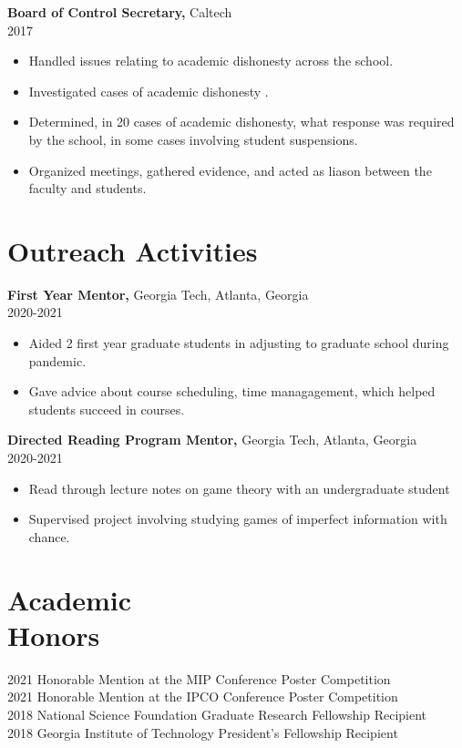 \documentclass[margin]{res}
\begin{document}
\begin{resume}
		{\bf Board of Control Secretary,} Caltech \\   2017
        \begin{itemize} \itemsep -2pt
             \item Handled issues relating to academic dishonesty across the school.
             \item Investigated cases of academic dishonesty .
             \item Determined, in 20 cases of academic dishonesty, what response was required by the school, in some cases involving student suspensions.
             \item Organized meetings, gathered evidence, and acted as liason between the faculty and students.
		 \end{itemize}

\section{Outreach   Activities} 
       {\bf First Year Mentor,} Georgia Tech, Atlanta, Georgia     \\         2020-2021 
        \begin{itemize} \itemsep -2pt
            \item Aided 2 first year graduate students in adjusting to graduate school during pandemic.
          \item Gave advice about course scheduling, time managagement, which helped students succeed in courses.
		 \end{itemize}

       {\bf Directed Reading Program Mentor,} Georgia Tech, Atlanta, Georgia     \\         2020-2021 
        \begin{itemize} \itemsep -2pt
            \item Read through lecture notes on game theory with an undergraduate student
          \item Supervised project involving studying games of imperfect information with chance.
		 \end{itemize}


\section{Academic \\ Honors} 
2021 Honorable Mention at the MIP Conference Poster Competition\\
2021 Honorable Mention at the IPCO Conference Poster Competition\\
2018 National Science Foundation Graduate Research Fellowship Recipient\\
2018 Georgia Institute of Technology President's Fellowship Recipient


\end{resume}
\end{document}

